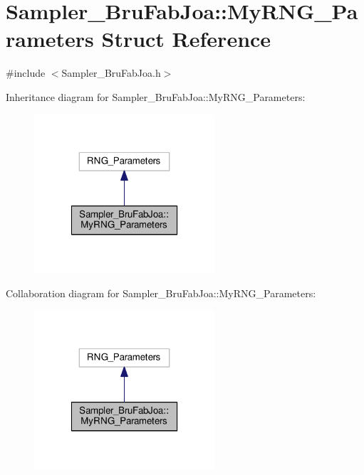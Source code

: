 \hypertarget{struct_sampler___bru_fab_joa_1_1_my_r_n_g___parameters}{\section{Sampler\-\_\-\-Bru\-Fab\-Joa\-:\-:My\-R\-N\-G\-\_\-\-Parameters Struct Reference}
\label{struct_sampler___bru_fab_joa_1_1_my_r_n_g___parameters}
}


{\ttfamily \#include $<$Sampler\-\_\-\-Bru\-Fab\-Joa.\-h$>$}



Inheritance diagram for Sampler\-\_\-\-Bru\-Fab\-Joa\-:\-:My\-R\-N\-G\-\_\-\-Parameters\-:
\nopagebreak
\begin{figure}[H]
\begin{center}
\leavevmode
\includegraphics[width=190pt]{struct_sampler___bru_fab_joa_1_1_my_r_n_g___parameters__inherit__graph}
\end{center}
\end{figure}


Collaboration diagram for Sampler\-\_\-\-Bru\-Fab\-Joa\-:\-:My\-R\-N\-G\-\_\-\-Parameters\-:
\nopagebreak
\begin{figure}[H]
\begin{center}
\leavevmode
\includegraphics[width=190pt]{struct_sampler___bru_fab_joa_1_1_my_r_n_g___parameters__coll__graph}
\end{center}
\end{figure}
